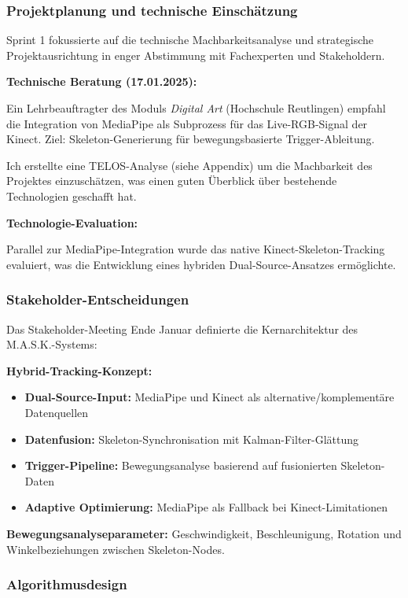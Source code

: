 \subsubsection{Projektplanung und technische Einschätzung}

Sprint 1 fokussierte auf die technische Machbarkeitsanalyse und strategische Projektausrichtung in enger Abstimmung mit Fachexperten und Stakeholdern.

\textbf{Technische Beratung (17.01.2025):}
\raggedright Ein Lehrbeauftragter des Moduls \textit{Digital Art} (Hochschule Reutlingen) empfahl die Integration von MediaPipe als Subprozess für das Live-RGB-Signal der Kinect. Ziel: Skeleton-Generierung für bewegungsbasierte Trigger-Ableitung.

Ich erstellte eine TELOS-Analyse (siehe Appendix) um die Machbarkeit des Projektes einzuschätzen, was einen guten Überblick über bestehende Technologien geschafft hat.

\textbf{Technologie-Evaluation:}
\raggedright Parallel zur MediaPipe-Integration wurde das native Kinect-Skeleton-Tracking evaluiert, was die Entwicklung eines hybriden Dual-Source-Ansatzes ermöglichte.

\subsubsection{Stakeholder-Entscheidungen}

Das Stakeholder-Meeting Ende Januar definierte die Kernarchitektur des M.A.S.K.-Systems:

\textbf{Hybrid-Tracking-Konzept:}
\begin{itemize}
    \item \textbf{Dual-Source-Input:} MediaPipe und Kinect als alternative/komplementäre Datenquellen
    \item \textbf{Datenfusion:} Skeleton-Synchronisation mit Kalman-Filter-Glättung
    \item \textbf{Trigger-Pipeline:} Bewegungsanalyse basierend auf fusionierten Skeleton-Daten
    \item \textbf{Adaptive Optimierung:} MediaPipe als Fallback bei Kinect-Limitationen
\end{itemize}

\textbf{Bewegungsanalyseparameter:}
Geschwindigkeit, Beschleunigung, Rotation und Winkelbeziehungen zwischen Skeleton-Nodes.


\subsubsection{Algorithmusdesign}

